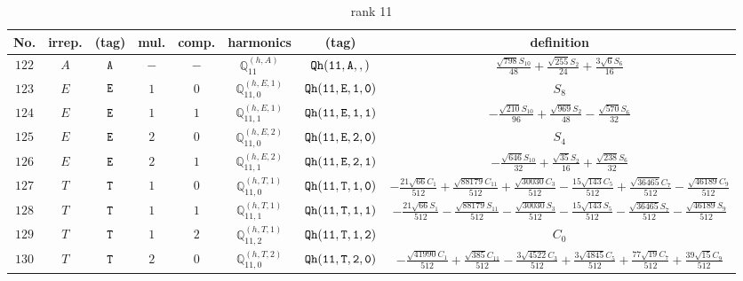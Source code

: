\documentclass[fleqn,8pt]{jsarticle}
\begin{document}
\begin{table}[ht!]
\begin{center}
\caption{rank 11}
\renewcommand{\arraystretch}{1.3}
\begin{tabular}{cccccccc} \hline \hline
No. & irrep. & (tag) & mul. & comp. & harmonics & (tag) & definition \\ \hline
$ 122 $ & $ A $ & $ {\tt A} $ & $ - $ & $ - $ & $ \mathbb{Q}_{11}^{(h,A)} $ & $ {\tt Qh(11,A,,)} $ & $ \frac{\sqrt{798} S_{10}}{48} + \frac{\sqrt{255} S_{2}}{24} + \frac{3 \sqrt{6} S_{6}}{16} $ \\
$ 123 $ & $ E $ & $ {\tt E} $ & $ 1 $ & $ 0 $ & $ \mathbb{Q}_{11,0}^{(h,E,1)} $ & $ {\tt Qh(11,E,1,0)} $ & $ S_{8} $ \\
$ 124 $ & $ E $ & $ {\tt E} $ & $ 1 $ & $ 1 $ & $ \mathbb{Q}_{11,1}^{(h,E,1)} $ & $ {\tt Qh(11,E,1,1)} $ & $ - \frac{\sqrt{210} S_{10}}{96} + \frac{\sqrt{969} S_{2}}{48} - \frac{\sqrt{570} S_{6}}{32} $ \\
$ 125 $ & $ E $ & $ {\tt E} $ & $ 2 $ & $ 0 $ & $ \mathbb{Q}_{11,0}^{(h,E,2)} $ & $ {\tt Qh(11,E,2,0)} $ & $ S_{4} $ \\
$ 126 $ & $ E $ & $ {\tt E} $ & $ 2 $ & $ 1 $ & $ \mathbb{Q}_{11,1}^{(h,E,2)} $ & $ {\tt Qh(11,E,2,1)} $ & $ - \frac{\sqrt{646} S_{10}}{32} + \frac{\sqrt{35} S_{2}}{16} + \frac{\sqrt{238} S_{6}}{32} $ \\
$ 127 $ & $ T $ & $ {\tt T} $ & $ 1 $ & $ 0 $ & $ \mathbb{Q}_{11,0}^{(h,T,1)} $ & $ {\tt Qh(11,T,1,0)} $ & $ - \frac{21 \sqrt{66} C_{1}}{512} + \frac{\sqrt{88179} C_{11}}{512} + \frac{\sqrt{30030} C_{3}}{512} - \frac{15 \sqrt{143} C_{5}}{512} + \frac{\sqrt{36465} C_{7}}{512} - \frac{\sqrt{46189} C_{9}}{512} $ \\
$ 128 $ & $ T $ & $ {\tt T} $ & $ 1 $ & $ 1 $ & $ \mathbb{Q}_{11,1}^{(h,T,1)} $ & $ {\tt Qh(11,T,1,1)} $ & $ - \frac{21 \sqrt{66} S_{1}}{512} - \frac{\sqrt{88179} S_{11}}{512} - \frac{\sqrt{30030} S_{3}}{512} - \frac{15 \sqrt{143} S_{5}}{512} - \frac{\sqrt{36465} S_{7}}{512} - \frac{\sqrt{46189} S_{9}}{512} $ \\
$ 129 $ & $ T $ & $ {\tt T} $ & $ 1 $ & $ 2 $ & $ \mathbb{Q}_{11,2}^{(h,T,1)} $ & $ {\tt Qh(11,T,1,2)} $ & $ C_{0} $ \\
$ 130 $ & $ T $ & $ {\tt T} $ & $ 2 $ & $ 0 $ & $ \mathbb{Q}_{11,0}^{(h,T,2)} $ & $ {\tt Qh(11,T,2,0)} $ & $ - \frac{\sqrt{41990} C_{1}}{512} + \frac{\sqrt{385} C_{11}}{512} - \frac{3 \sqrt{4522} C_{3}}{512} + \frac{3 \sqrt{4845} C_{5}}{512} + \frac{77 \sqrt{19} C_{7}}{512} + \frac{39 \sqrt{15} C_{9}}{512} $ \\

\end{tabular}
\end{center}
\end{table}
\end{document}
